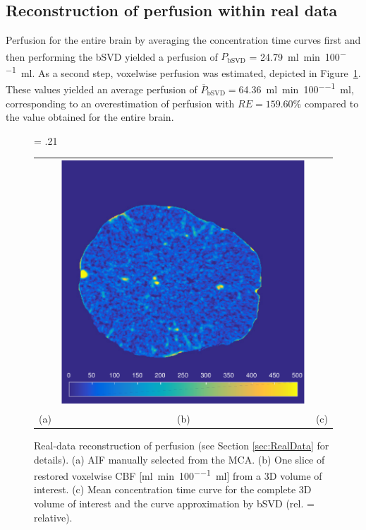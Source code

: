 \documentclass[final,5p,times,twocolumn]{elsarticle}
\begin{document}
	
	\subsection{Reconstruction of perfusion within real data}\label{sec:resultsrealdata}
	 Perfusion for the entire brain by averaging the concentration time curves first and then performing the bSVD yielded a perfusion of $P_{\mathrm{bSVD}}$ = \SI{24.79}{\milli\litre\per\minute\per100\milli\litre}. As a second step, voxelwise perfusion was estimated, depicted in Figure~\ref{fig:RealData}. These values yielded an average perfusion of $\overline{P}_{\mathrm{bSVD}} = $\SI{64.36}{\milli\litre\per\minute\per100\milli\litre}, corresponding to an overestimation of perfusion with $RE = 159.60\%$ compared to the value obtained for the entire brain.	


	\begin{figure}[!htb]
		\fwd = .21\textwidth
		\centering
		\begin{tabular}{ccc}
		 {\small} & \includegraphics[width = \fwd]{./figs/real_axial160.pdf} & {\small} \\
		 (a) & (b) & (c) 
		\end{tabular}
		\caption{Real-data reconstruction of perfusion (see Section \ref{sec:RealData} for details). (a) AIF manually selected from the MCA. (b) One slice of restored voxelwise CBF [\si{\milli\litre\per\minute\per100\milli\litre}] from a 3D volume of interest. (c) Mean concentration time curve for the complete 3D volume of interest and the curve approximation by bSVD (rel. = relative).}
	\label{fig:RealData}
	\end{figure}
\end{document}
